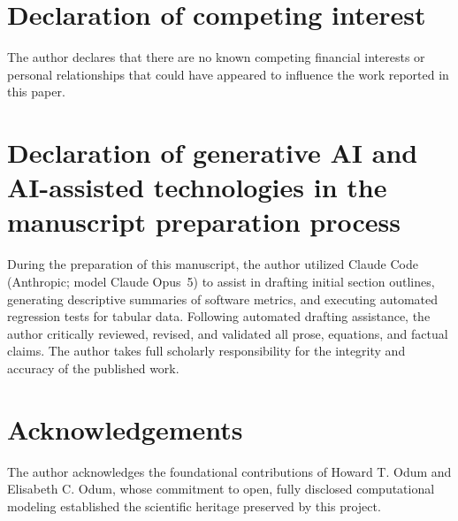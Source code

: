 \documentclass[11pt,a4paper]{article}
\begin{document}
\section*{Declaration of competing interest}
The author declares that there are no known competing financial interests or personal relationships that could have appeared to influence the work reported in this paper.

\section*{Declaration of generative AI and AI-assisted technologies in the manuscript preparation process}
During the preparation of this manuscript, the author utilized Claude Code (Anthropic; model Claude Opus~5) to assist in drafting initial section outlines, generating descriptive summaries of software metrics, and executing automated regression tests for tabular data. Following automated drafting assistance, the author critically reviewed, revised, and validated all prose, equations, and factual claims. The author takes full scholarly responsibility for the integrity and accuracy of the published work.

\section*{Acknowledgements}
The author acknowledges the foundational contributions of Howard T. Odum and Elisabeth C. Odum, whose commitment to open, fully disclosed computational modeling established the scientific heritage preserved by this project.
\end{document}
